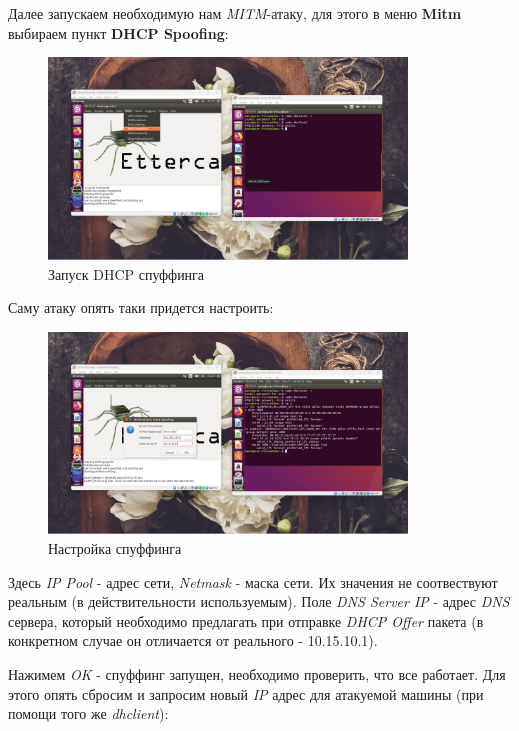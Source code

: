 \documentclass[a4paper]{article}
\begin{document}
  Далее запускаем необходимую нам \textit{MITM}-атаку, для этого в меню \textbf{Mitm}
  выбираем пункт \textbf{DHCP Spoofing}:

  \begin{figure}[H]
    \centering
    \includegraphics[width=0.85\textwidth]{02_00 (27)}
    \caption{Запуск DHCP спуффинга}
    \label{img:0023}
  \end{figure}

  Саму атаку опять таки придется настроить:

  \begin{figure}[H]
    \centering
    \includegraphics[width=0.85\textwidth]{02_00 (28)}
    \caption{Настройка спуффинга}
    \label{img:0024}
  \end{figure}

  Здесь \textit{IP Pool} - адрес сети, \textit{Netmask} - маска сети. Их значения 
  не соотвествуют реальным (в действительности используемым). Поле \textit{DNS Server IP} -
  адрес \textit{DNS} сервера, который необходимо предлагать при отправке \textit{DHCP Offer} пакета
  (в конкретном случае он отличается от реального - 10.15.10.1). 

  Нажимем \textit{OK} - спуффинг запущен, необходимо проверить, что все работает. Для этого
  опять сбросим и запросим новый \textit{IP} адрес для атакуемой машины (при помощи того же \textit{dhclient}):
\end{document}
